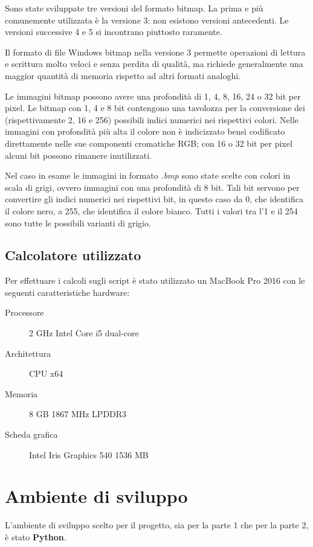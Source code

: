 \documentclass[preprint,12pt]{elsarticle}
\begin{document}
Sono state sviluppate tre versioni del formato bitmap. La prima e più comunemente utilizzata è la versione 3: non esistono versioni antecedenti. Le versioni successive 4 e 5 si incontrano piuttosto raramente.

Il formato di file Windows bitmap nella versione 3 permette operazioni di lettura e scrittura molto veloci e senza perdita di qualità, ma richiede generalmente una maggior quantità di memoria rispetto ad altri formati analoghi.

Le immagini bitmap possono avere una profondità di 1, 4, 8, 16, 24 o 32 bit per pixel. Le bitmap con 1, 4 e 8 bit contengono una tavolozza per la conversione dei (rispettivamente 2, 16 e 256) possibili indici numerici nei rispettivi colori. Nelle immagini con profondità più alta il colore non è indicizzato bensì codificato direttamente nelle sue componenti cromatiche RGB; con 16 o 32 bit per pixel alcuni bit possono rimanere inutilizzati.

Nel caso in esame le immagini in formato \textit{.bmp} sono state scelte con colori in scala di grigi, ovvero immagini con una profondità di 8 bit. Tali bit servono per convertire gli indici numerici nei rispettivi bit, in questo caso da 0, che identifica il colore nero, a 255, che identifica il colore bianco. Tutti i valori tra l'1 e il 254 sono tutte le possibili varianti di grigio.

\subsection{Calcolatore utilizzato}
Per effettuare i calcoli sugli script è stato utilizzato un MacBook Pro 2016 con le seguenti caratteristiche hardware:
\begin{description}
\item[Processore] 2 GHz Intel Core i5 dual-core
\item[Architettura] CPU x64
\item[Memoria] 8 GB 1867 MHz LPDDR3
\item[Scheda grafica] Intel Iris Graphics 540 1536 MB
\end{description}

\newpage

\section{Ambiente di sviluppo}

L'ambiente di sviluppo scelto per il progetto, sia per la parte 1 che per la parte 2, è stato \textbf{Python}.
\end{document}

